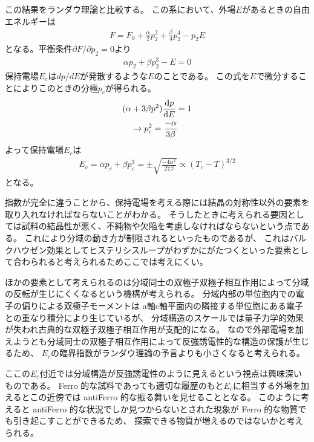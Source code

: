 \documentclass[9pt,dvipdfmx,a4paper]{jsarticle}
\begin{document}
この結果をランダウ理論と比較する。
この系において、外場\(E\)があるときの自由エネルギーは
\begin{align}
    F = F_0 + \frac{\alpha}{2} p_2^2 + \frac{\beta}{4} p_2^4 -p_2E
\end{align}
となる。平衡条件\(\partial F/\partial p_2 = 0\)より
\begin{align}
    \alpha p_2 + \beta p_2^3 - E = 0
\end{align}
保持電場\(E_c\)は\(dp/dE\)が発散するような\(E\)のことである。
この式を\(E\)で微分することによりこのときの分極\(p_c\)が得られる。
\begin{align}
    &(\alpha+3\beta p^2)\dv{p}{E} = 1 \\
    &\quad \rightarrow p_c^2 = \frac{-\alpha}{3\beta}
\end{align}
よって保持電場\(E_c\)は
\begin{align}
    E_c = \alpha p_c + \beta p_c^3 = \pm\sqrt{\frac{-4\alpha^3}{27\beta}} \propto (T_c-T)^{3/2}
\end{align}
となる。

指数が完全に違うことから、保持電場を考える際には結晶の対称性以外の要素を取り入れなければならないことがわかる。
そうしたときに考えられる要因としては試料の結晶性が悪く、不純物や欠陥を考慮しなければならないという点である。
これにより分域の動き方が制限されるといったものであるが、
これはバルクハウゼン効果としてヒステリシスループがわずかにがたつくといった要素として合わられると考えられるためここでは考えにくい。

ほかの要素として考えられるのは分域同士の双極子双極子相互作用によって分域の反転が生じにくくなるという機構が考えられる。
分域内部の単位胞内での電子の偏りによる双極子モーメントは a軸c軸平面内の隣接する単位胞にある電子との重なり積分により生じているが、
分域構造のスケールでは量子力学的効果が失われ古典的な双極子双極子相互作用が支配的になる。
なので外部電場を加えようとも分域同士の双極子相互作用によって反強誘電性的な構造の保護が生じるため、
\(E_c\)の臨界指数がランダウ理論の予言よりも小さくなると考えられる。

ここの\(E_c\)付近では分域構造が反強誘電性のように見えるという視点は興味深いものである。
Ferro 的な試料であっても適切な履歴のもと\(E_c\)に相当する外場を加えるとこの近傍では antiFerro 的な振る舞いを見せることとなる。
このように考えると antiFerro 的な状況でしか見つからないとされた現象が Ferro 的な物質でも引き起こすことができるため、
探索できる物質が増えるのではないかと考えられる。
\end{document}
